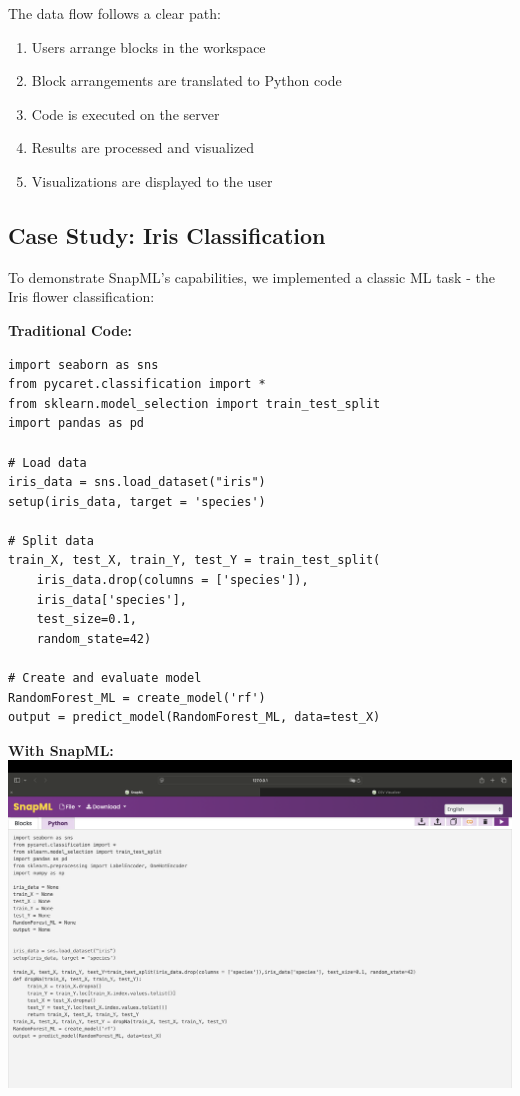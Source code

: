 \documentclass[a0paper,portrait]{article}
\newcommand{\compresslist}{%
\setlength{\itemsep}{0pt}%
\setlength{\parskip}{0pt}%
\setlength{\parsep}{0pt}%
}
\begin{document}
\begin{multicols}{2}
The data flow follows a clear path:
\begin{enumerate}\compresslist
    \item Users arrange blocks in the workspace
    \item Block arrangements are translated to Python code
    \item Code is executed on the server
    \item Results are processed and visualized
    \item Visualizations are displayed to the user
\end{enumerate}

\end{multicols}

\begin{multicols}{2}

\section{Case Study: Iris Classification}

To demonstrate SnapML's capabilities, we implemented a classic ML task - the Iris flower classification:

\begin{minipage}[t]{0.48\textwidth}
\textbf{Traditional Code:}
\begin{lstlisting}[basicstyle=\ttfamily\normalsize]
import seaborn as sns
from pycaret.classification import *
from sklearn.model_selection import train_test_split
import pandas as pd

# Load data
iris_data = sns.load_dataset("iris")
setup(iris_data, target = 'species')

# Split data
train_X, test_X, train_Y, test_Y = train_test_split(
    iris_data.drop(columns = ['species']),
    iris_data['species'], 
    test_size=0.1, 
    random_state=42)
    
# Create and evaluate model
RandomForest_ML = create_model('rf')
output = predict_model(RandomForest_ML, data=test_X)
\end{lstlisting}
\end{minipage}
\hfill
\begin{minipage}[t]{0.48\textwidth}
\textbf{With SnapML:}
\includegraphics[width=\linewidth]{范例程序生成的对应python代码.png}
\end{minipage}


\end{multicols}
\end{document}
